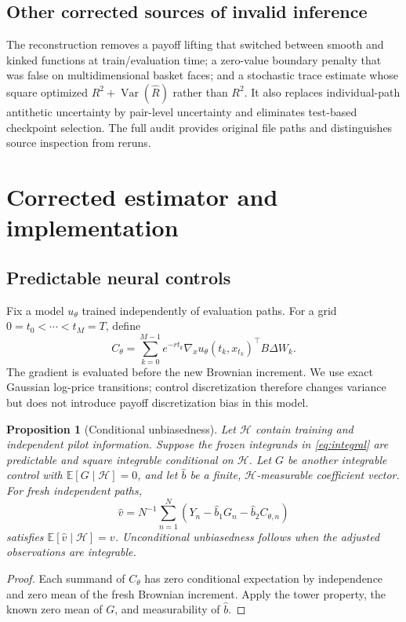 \documentclass[10pt]{article}
\newtheorem{proposition}{Proposition}
\newcommand{\E}{\mathbb{E}}
\newcommand{\Var}{\operatorname{Var}}
\begin{document}
\subsection{Other corrected sources of invalid inference}
The reconstruction removes a payoff lifting that switched between smooth and
kinked functions at train/evaluation time; a zero-value boundary penalty that
was false on multidimensional basket faces; and a stochastic trace estimate
whose square optimized $R^2+\Var(\widehat R)$ rather than $R^2$.
It also replaces individual-path antithetic uncertainty by pair-level
uncertainty and eliminates test-based checkpoint selection. The full audit
provides original file paths and distinguishes source inspection from reruns.

\section{Corrected estimator and implementation}
\subsection{Predictable neural controls}
Fix a model $u_\theta$ trained independently of evaluation paths. For a grid
$0=t_0<\cdots<t_M=T$, define
\begin{equation}\label{eq:integral}
 C_\theta=\sum_{k=0}^{M-1}e^{-rt_k}
 \nabla_xu_\theta(t_k,x_{t_k})^\top B\Delta W_k.
\end{equation}
The gradient is evaluated before the new Brownian increment. We use exact
Gaussian log-price transitions; control discretization therefore changes
variance but does not introduce payoff discretization bias in this model.

\begin{proposition}[Conditional unbiasedness]
Let $\mathcal H$ contain training and independent pilot information. Suppose the
frozen integrands in \eqref{eq:integral} are predictable and square integrable
conditional on $\mathcal H$. Let $G$ be another integrable control with
$\E[G\mid\mathcal H]=0$, and let $\widehat b$ be a finite,
$\mathcal H$-measurable coefficient vector. For fresh independent paths,
\begin{equation}
 \widehat v=N^{-1}\sum_{n=1}^N
 \left(Y_n-\widehat b_1G_n-\widehat b_2C_{\theta,n}\right)
\end{equation}
satisfies $\E[\widehat v\mid\mathcal H]=v$. Unconditional unbiasedness follows
when the adjusted observations are integrable.
\end{proposition}
\begin{proof}
Each summand of $C_\theta$ has zero conditional expectation by independence and
zero mean of the fresh Brownian increment. Apply the tower property, the
known zero mean of $G$, and measurability of $\widehat b$.
\end{proof}
\end{document}
